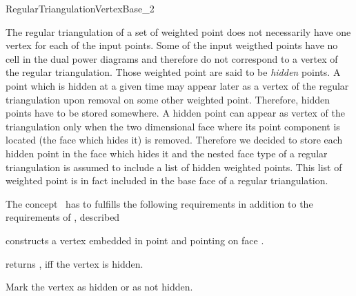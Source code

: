 

\begin{ccRefConcept}{RegularTriangulationVertexBase_2}


\ccDefinition
  
The regular triangulation of a set of weighted point does not
necessarily
have one vertex for each of the input points. Some of the input
weigthed points have no cell in the dual power diagrams
and therefore do not correspond to a vertex of the regular
triangulation.
Those weighted point are said to be {\it hidden} points.
A  point which is hidden at a given time may appear later as a vertex of
the regular triangulation upon removal on some other weighted point.
Therefore, hidden points have to be stored somewhere.
A hidden point can appear as vertex of the triangulation
only when the
two dimensional face where its point component is located
(the face which hides it)
is removed. Therefore we decided to store each hidden point
in the face which  hides it and the nested face type of a 
regular triangulation is assumed to include a list of hidden 
weighted points. This list of weighted point is in fact included
in the base face of a regular triangulation.

The concept \ccRefName\ 
has to fulfills the following requirements
in addition to the requirements of ,
described \ccRefPage{TriangulationVertexBase_2}


\ccCreation
{}  %

\ccGlue
{}
{constructs a vertex embedded in point \ccc{p} and pointing on face \ccc{f}.}


{returns , iff the vertex is hidden.}

{Mark the vertex as hidden or as not hidden.}


\ccHasModels
{}

\ccSeeAlso
{}

\end{ccRefConcept}


